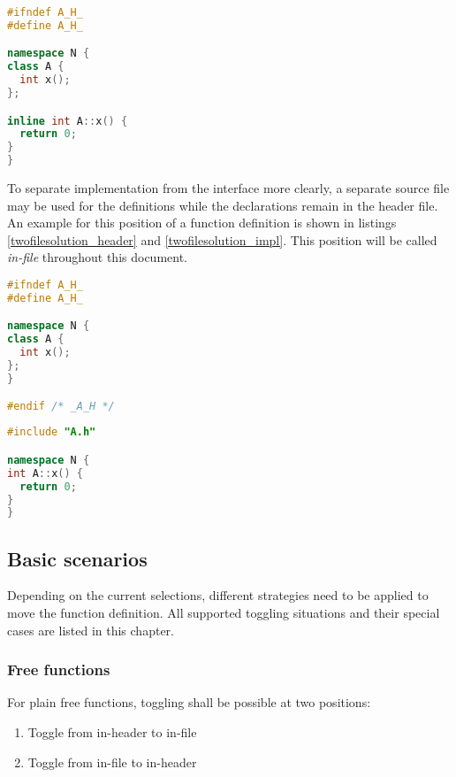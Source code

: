 \begin{lstlisting}[caption={In-header implementation in A.h},
label={inheaderimpl}, language=C++ ]
#ifndef A_H_
#define A_H_

namespace N {
class A {
  int x();
};

inline int A::x() {
  return 0;
}
}
\end{lstlisting}

To separate implementation from the interface more 
clearly, a separate source file may be used for the definitions while the 
declarations remain in the header file. An example for this position of a 
function definition is shown in listings \ref{twofilesolution_header} and
\ref{twofilesolution_impl}. This position will be called \textit{in-file} 
throughout this document.

\vspace{0.5cm}
\begin{minipage}{.48\textwidth}
\lstset{xrightmargin=0.5cm}
\begin{lstlisting}[caption={A.h},label={twofilesolution_header},language=C++]
#ifndef A_H_
#define A_H_

namespace N {
class A {
  int x();
};
}

#endif /* _A_H */
\end{lstlisting}
\end{minipage}%
\begin{minipage}{.48\textwidth}
\lstset{xleftmargin=0.5cm}
\begin{lstlisting}[caption={A.cpp},label={twofilesolution_impl},language=C++]
#include "A.h"

namespace N {
int A::x() { 
  return 0;
}
}
\end{lstlisting}
\end{minipage}

\subsection{Basic scenarios}

Depending on the current selections, different strategies need to be applied to 
move the function definition. All supported toggling situations and their 
special cases are listed in this chapter.

\subsubsection{Free functions}
For plain free functions, toggling shall be possible at two positions:
\begin{enumerate}
\item Toggle from in-header to in-file
\item Toggle from in-file to in-header
\end{enumerate}

